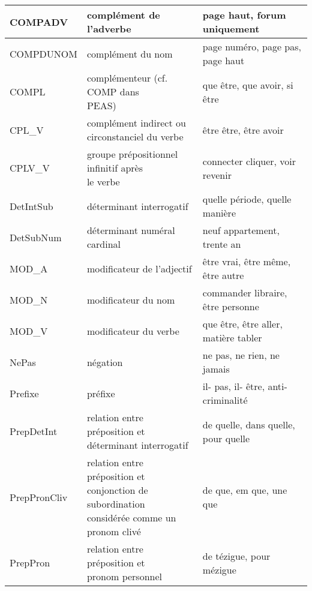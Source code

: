 \documentclass[oneside,parskip,draft]{scrbook}
\makeatletter
\newcommand{\specialcell}[2][l]{%
      \begin{tabular}[#1]{@{}l@{}}#2\end{tabular}}
\makeatother
\begin{document}
\begin{longtable}{lll}
    COMPADV       &  complément de l'adverbe               & page haut, forum uniquement \\ \midrule
    COMPDUNOM     &  complément du nom                     & page numéro, page pas, page haut \\ \midrule
    COMPL         &  \specialcell{complémenteur (cf. COMP dans \\ PEAS)} & que être, que avoir, si être \\ \midrule
    CPL\_V        &  \specialcell{complément indirect ou \\ circonstanciel du verbe } & être être, être avoir  \\ \midrule
    CPLV\_V       &  \specialcell{groupe prépositionnel infinitif après \\ le verbe} & connecter cliquer, voir revenir \\ \midrule
    DetIntSub     &  déterminant interrogatif              & quelle période, quelle manière \\ \midrule
    DetSubNum     &  déterminant numéral cardinal          & neuf appartement, trente an \\ \midrule
    MOD\_A        &  modificateur de l'adjectif            & être vrai, être même, être autre \\ \midrule
    MOD\_N        &  modificateur du nom                   & commander libraire, être personne  \\ \midrule
    MOD\_V        &  modificateur du verbe                 & que être, être aller, matière tabler \\ \midrule
    NePas         &  négation                              & ne pas, ne rien, ne jamais \\ \midrule
    Prefixe       &  préfixe                               & il- pas, il- être, anti-criminalité \\ \midrule
    PrepDetInt    &  \specialcell{relation entre préposition et \\ déterminant interrogatif} & de quelle, dans quelle, pour quelle \\ \midrule
    PrepPronCliv  &  \specialcell{relation entre préposition et \\ conjonction de subordination \\ considérée comme un pronom clivé} & de que, em que, une que \\ \midrule
    PrepPron      &  \specialcell{relation entre préposition et \\ pronom personnel} & de tézigue, pour mézigue \\ \midrule

\end{longtable}
\end{document}
